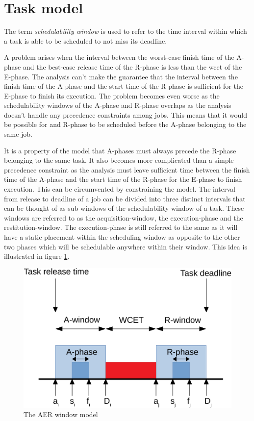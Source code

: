 \documentclass{kththesis}
\begin{document}
\section{Task model}

The term \textit{schedulability window} is used to refer to the time interval within which a task is
able to be scheduled to not miss its deadline. 

A problem arises when the interval between the worst-case finish time of the A-phase and the
best-case release time of the R-phase is less than the \acrshort{wcet} of the E-phase. The analysis
can't make the guarantee that the interval between the finish time of the A-phase and the start time
of the R-phase is sufficient for the E-phase to finish its execution. The problem becomes even worse
as the schedulability windows of the A-phase and R-phase overlaps as the analysis doesn't handle any
precedence constraints among jobs. This means that it would be possible for and R-phase to be
scheduled before the A-phase belonging to the same job.

It is a property of the model that A-phases must always precede the R-phase belonging to the same
task. It also becomes more complicated than a simple precedence constraint as the analysis must
leave sufficient time between the finish time of the A-phase and the start time of the R-phase for
the E-phase to finish execution. This can be circumvented by constraining the model. The interval
from release to deadline of a job can be divided into three distinct intervals that can be thought of
as sub-windows of the schedulability window of a task. These windows are referred to as the
acquisition-window, the execution-phase and the restitution-window. The execution-phase is still
referred to the same as it will have a static placement within the scheduling window as opposite to
the other two phases which will be schedulable anywhere within their window. This idea is
illustrated in figure \ref{fig:aer_window_model}.


\begin{figure}

    \centering

    \includegraphics[width=0.8\linewidth]{images/aer_window_model.pdf}

    \caption{The AER window model}

    \label{fig:aer_window_model}

\end{figure}
\end{document}

